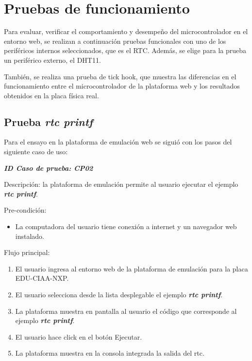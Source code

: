 \section{Pruebas de funcionamiento}  
\label{sec:Pruebas de funcionamiento}

Para evaluar, verificar el comportamiento y desempeño del microcontrolador en el entorno web, se realizan a continuación pruebas funcionales con uno de los periféricos internos seleccionados, que es el RTC. Además, se elige para la prueba un periférico externo, el DHT11.

También, se realiza una prueba de \textquotedbl tick hook\textquotedbl, que muestra las diferencias en el funcionamiento entre el microcontrolador de la plataforma web y los resultados obtenidos en la placa física real.

\subsection{ Prueba \textit{\textbf{rtc printf}}}

Para el ensayo en la plataforma de emulación web se siguió con los pasos del siguiente caso de uso:

\textit{\textbf{ID Caso de prueba: CP02}}

Descripción: la plataforma de emulación permite al usuario ejecutar el ejemplo \textit{\textbf{rtc printf}}.

Pre-condición: 
\begin{itemize}
	\item La computadora del usuario tiene conexión a internet y un navegador web instalado.
\end{itemize}

Flujo principal:
\begin{enumerate}
	\item El usuario ingresa al entorno web de la plataforma de emulación para la placa EDU-CIAA-NXP.
	\item El usuario selecciona desde la lista desplegable el ejemplo \textit{\textbf{rtc printf}}.
	\item La plataforma muestra en pantalla al usuario el código que corresponde al ejemplo \textit{\textbf{rtc printf}}.
	\item El usuario hace click en el botón \textquotedbl Ejecutar\textquotedbl.
	\item La plataforma muestra en la consola integrada la salida del rtc.
\end{enumerate}


